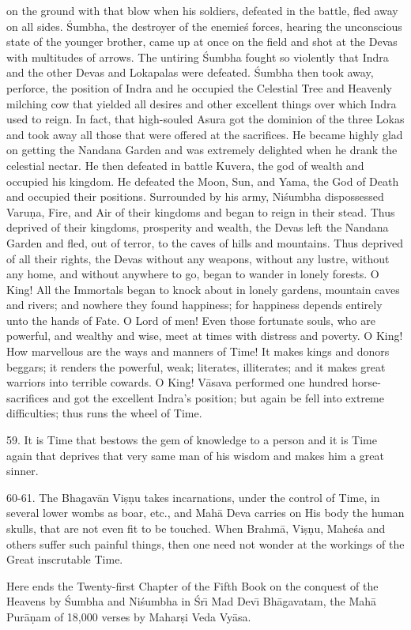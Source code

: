 on the ground with that blow when his soldiers, defeated in the battle, fled away on all sides. \'Sumbha, the destroyer of the enemie\'s forces, hearing the unconscious state of the younger brother, came up at once on the field and shot at the Devas with multitudes of arrows. The untiring \'Sumbha fought so violently that Indra and the other Devas and Lokapalas were defeated. \'Sumbha then took away, perforce, the position of Indra and he occupied the Celestial Tree and Heavenly milching cow that yielded all desires and other excellent things over which Indra used to reign. In fact, that high-souled Asura got the dominion of the three Lokas and took away all those that were offered at the sacrifices. He became highly glad on getting the Nandana Garden and was extremely delighted when he drank the celestial nectar. He then defeated in battle Kuvera, the god of wealth and occupied his kingdom. He defeated the Moon, Sun, and Yama, the God of Death and occupied their positions. Surrounded by his army, Ni\'sumbha dispossessed Varu\d{n}a, Fire, and Air of their kingdoms and began to reign in their stead. Thus deprived of their kingdoms, prosperity and wealth, the Devas left the Nandana Garden and fled, out of terror, to the caves of hills and mountains. Thus deprived of all their rights, the Devas without any weapons, without any lustre, without any home, and without anywhere to go, began to wander in lonely forests. O King! All the Immortals began to knock about in lonely gardens, mountain caves and rivers; and nowhere they found happiness; for happiness depends entirely unto the hands of Fate. O Lord of men! Even those fortunate souls, who are powerful, and wealthy and wise, meet at times with distress and poverty. O King! How marvellous are the ways and manners of Time! It makes kings and donors beggars; it renders the powerful, weak; literates, illiterates; and it makes great warriors into terrible cowards. O King! V\=asava performed one hundred horse-sacrifices and got the excellent Indra's position; but again be fell into extreme difficulties; thus runs the wheel of Time.

59. It is Time that bestows the gem of knowledge to a person and it is Time again that deprives that very same man of his wisdom and makes him a great sinner.

60-61. The Bhagav\=an Vi\d{s}\d{n}u takes incarnations, under the control of Time, in several lower wombs as boar, etc., and Mah\=a Deva carries on His body the human skulls, that are not even fit to be touched. When Brahm\=a, Vi\d{s}\d{n}u, Mahe\'sa and others suffer such painful things, then one need not wonder at the workings of the Great inscrutable Time.

Here ends the Twenty-first Chapter of the Fifth Book on the conquest of the Heavens by \'Sumbha and Ni\'sumbha in \'Sr\={\i} Mad Dev\={\i} Bh\=agavatam, the Mah\=a Pur\=a\d{n}am of 18,000 verses by Mahar\d{s}i Veda Vy\=asa.




